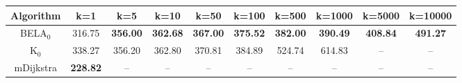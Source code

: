 \begin{tabular}{c|ccccccccc}\toprule
Algorithm & k=1 & k=5 & k=10 & k=50 & k=100 & k=500 & k=1000 & k=5000 & k=10000 \\ \midrule
BELA$_0$ & 316.75 & \textbf{356.00} & \textbf{362.68} & \textbf{367.00} & \textbf{375.52} & \textbf{382.00} & \textbf{390.49} & \textbf{408.84} & \textbf{491.27} \\
K$_0$ & 338.27 & 356.20 & 362.80 & 370.81 & 384.89 & 524.74 & 614.83 & -- & -- \\
mDijkstra & \textbf{228.82} & -- & -- & -- & -- & -- & -- & -- & -- \\ \bottomrule 
\end{tabular}
